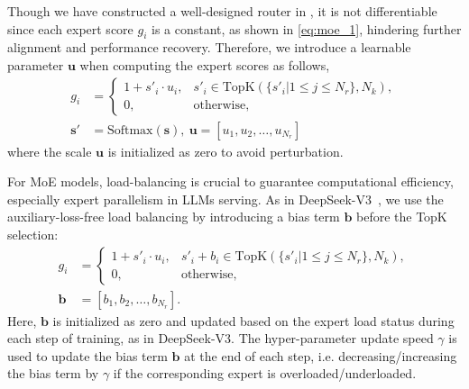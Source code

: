 Though we have constructed a well-designed router in , it is not differentiable since each expert score $g_i$ is a constant, as shown in \eqref{eq:moe_1}, hindering further alignment and performance recovery.
Therefore, we introduce a learnable parameter $\mathbf{u}$ when computing the expert scores as follows,
\begin{align}
    g_i \!&\!=\! \left\{ \begin{array}{ll}
        \!\!1 + s'_i\cdot u_i, &s'_i \in \text{TopK}(\{s'_i | 1\leq j\leq N_r\}, N_k), \nonumber \\ 
        \!\!0, & \text{otherwise},
    \end{array}\right. \nonumber \\
    \mathbf{s}' &= \text{Softmax}(\mathbf{s}),\ \textbf{u} = [u_1, u_2,\dots,u_{N_r}] 
\end{align}
where the scale $\mathbf{u}$ is initialized as zero to avoid perturbation.

For MoE models, load-balancing is crucial to guarantee computational efficiency, especially expert parallelism in LLMs serving.
As in DeepSeek-V3~\cite{liu2024deepseek}, we use the auxiliary-loss-free load balancing by introducing a bias term $\mathbf{b}$ before the TopK selection:
\begin{align}
    g_i \!&\! =\! \left\{ \begin{array}{ll}
        \!\!1 + s'_i\cdot u_i, &s'_i +b_i \in \text{TopK}(\{s'_i | 1\leq j\leq N_r\}, N_k), \\ 
        \!\!0, & \text{otherwise},
    \end{array}\right. \nonumber \\
    \mathbf{b} &= [b_1, b_2, \dots, b_{N_r}].
\end{align}
Here, $\mathbf{b}$ is initialized as zero and updated based on the expert load status during each step of training, as in DeepSeek-V3.
The hyper-parameter update speed $\gamma$ is used to update the bias term $\mathbf{b}$ at the end of each step, i.e. decreasing/increasing the bias term by $\gamma$ if the corresponding expert is overloaded/underloaded.

% 
% 
